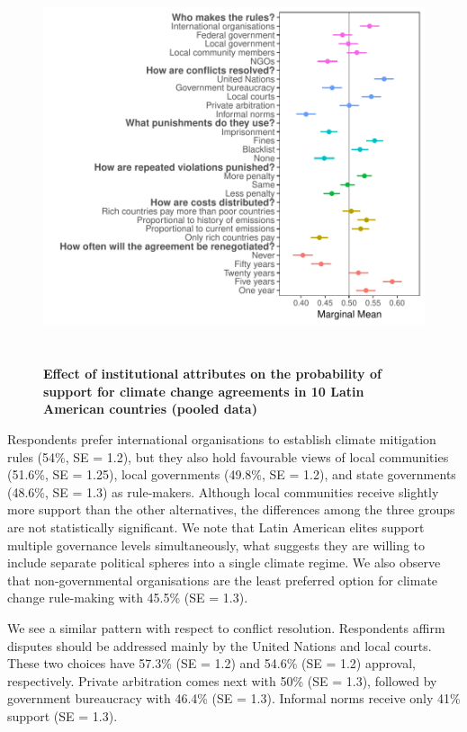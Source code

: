 \documentclass[a4paper,12pt]{article}
\begin{document}
\begin{figure}[H]
	\centering
	\includegraphics[width=.9\linewidth,height=11.5cm]{pooled.pdf}
	\caption{\textbf{Effect of institutional attributes on the probability of support for climate change agreements in 10 Latin American countries (pooled data)}}
	\label{fig:pooled}
\end{figure}

Respondents prefer international organisations to establish climate mitigation rules (54\%, SE = 1.2), but they also hold favourable views of local communities (51.6\%, SE = 1.25), local governments (49.8\%, SE = 1.2), and state governments (48.6\%, SE = 1.3) as rule-makers. Although local communities receive slightly more support than the other alternatives, the differences among the three groups are not statistically significant. We note that Latin American elites support multiple governance levels simultaneously, what suggests they are willing to include separate political spheres into a single climate regime. We also observe that non-governmental organisations are the least preferred option for climate change rule-making with 45.5\% (SE = 1.3). 

We see a similar pattern with respect to conflict resolution. Respondents affirm disputes should be addressed mainly by the United Nations and local courts. These two choices have 57.3\% (SE = 1.2) and 54.6\% (SE = 1.2) approval, respectively. Private arbitration comes next with 50\% (SE = 1.3), followed by government bureaucracy with 46.4\% (SE = 1.3). Informal norms receive only 41\% support (SE = 1.3). 
\end{document}
